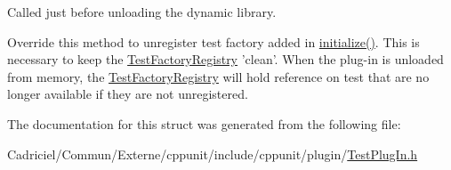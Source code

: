 Called just before unloading the dynamic library. 

Override this method to unregister test factory added in \hyperlink{struct_cpp_unit_test_plug_in_aec670330e7fced26c2a66b1dcd56edc0}{initialize()}. This is necessary to keep the \hyperlink{class_test_factory_registry}{Test\-Factory\-Registry} 'clean'. When the plug-\/in is unloaded from memory, the \hyperlink{class_test_factory_registry}{Test\-Factory\-Registry} will hold reference on test that are no longer available if they are not unregistered. 

The documentation for this struct was generated from the following file\-:\begin{DoxyCompactItemize}
\item 
Cadriciel/\-Commun/\-Externe/cppunit/include/cppunit/plugin/\hyperlink{_test_plug_in_8h}{Test\-Plug\-In.\-h}\end{DoxyCompactItemize}
